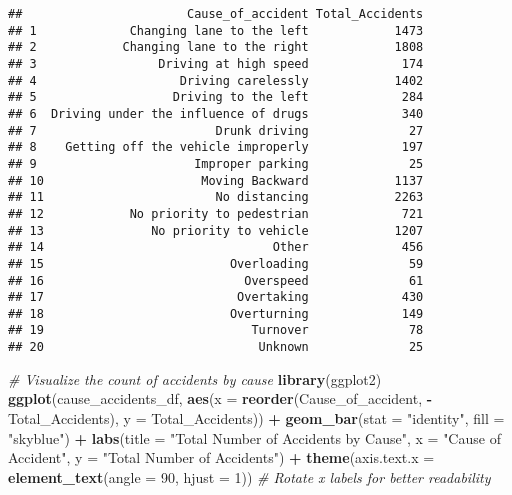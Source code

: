 \documentclass[
]{article}
\newenvironment{Shaded}{\begin{snugshade}}{\end{snugshade}}
\newcommand{\AttributeTok}[1]{\textcolor[rgb]{0.13,0.29,0.53}{#1}}
\newcommand{\CommentTok}[1]{\textcolor[rgb]{0.56,0.35,0.01}{\textit{#1}}}
\newcommand{\DecValTok}[1]{\textcolor[rgb]{0.00,0.00,0.81}{#1}}
\newcommand{\FunctionTok}[1]{\textcolor[rgb]{0.13,0.29,0.53}{\textbf{#1}}}
\newcommand{\NormalTok}[1]{#1}
\newcommand{\SpecialCharTok}[1]{\textcolor[rgb]{0.81,0.36,0.00}{\textbf{#1}}}
\newcommand{\StringTok}[1]{\textcolor[rgb]{0.31,0.60,0.02}{#1}}
\begin{document}
\begin{verbatim}
##                       Cause_of_accident Total_Accidents
## 1             Changing lane to the left            1473
## 2            Changing lane to the right            1808
## 3                 Driving at high speed             174
## 4                    Driving carelessly            1402
## 5                   Driving to the left             284
## 6  Driving under the influence of drugs             340
## 7                         Drunk driving              27
## 8    Getting off the vehicle improperly             197
## 9                      Improper parking              25
## 10                      Moving Backward            1137
## 11                        No distancing            2263
## 12            No priority to pedestrian             721
## 13               No priority to vehicle            1207
## 14                                Other             456
## 15                          Overloading              59
## 16                            Overspeed              61
## 17                           Overtaking             430
## 18                          Overturning             149
## 19                             Turnover              78
## 20                              Unknown              25
\end{verbatim}

\begin{Shaded}
\begin{Highlighting}[]
\CommentTok{\# Visualize the count of accidents by cause}
\FunctionTok{library}\NormalTok{(ggplot2)}
\FunctionTok{ggplot}\NormalTok{(cause\_accidents\_df, }\FunctionTok{aes}\NormalTok{(}\AttributeTok{x =} \FunctionTok{reorder}\NormalTok{(Cause\_of\_accident, }\SpecialCharTok{{-}}\NormalTok{Total\_Accidents), }\AttributeTok{y =}\NormalTok{ Total\_Accidents)) }\SpecialCharTok{+}
  \FunctionTok{geom\_bar}\NormalTok{(}\AttributeTok{stat =} \StringTok{"identity"}\NormalTok{, }\AttributeTok{fill =} \StringTok{"skyblue"}\NormalTok{) }\SpecialCharTok{+}
  \FunctionTok{labs}\NormalTok{(}\AttributeTok{title =} \StringTok{"Total Number of Accidents by Cause"}\NormalTok{, }
       \AttributeTok{x =} \StringTok{"Cause of Accident"}\NormalTok{, }
       \AttributeTok{y =} \StringTok{"Total Number of Accidents"}\NormalTok{) }\SpecialCharTok{+}
  \FunctionTok{theme}\NormalTok{(}\AttributeTok{axis.text.x =} \FunctionTok{element\_text}\NormalTok{(}\AttributeTok{angle =} \DecValTok{90}\NormalTok{, }\AttributeTok{hjust =} \DecValTok{1}\NormalTok{)) }\CommentTok{\# Rotate x labels for better readability}
\end{Highlighting}
\end{Shaded}
\end{document}

